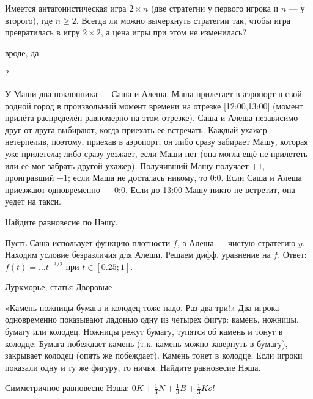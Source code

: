 \begin{problem}

Имеется антагонистическая игра $2\times n$ (две стратегии у первого игрока и $n$ — у второго), где $n\ge 2$. Всегда ли можно вычеркнуть стратегии так, чтобы игра превратилась в игру $2\times 2$, а цена игры при этом не изменилась?

\begin{sol}
 вроде, да
\end{sol}
\end{problem}

\begin{problem}
\begin{source}
\cite{ferguson:tn}?\end{source}
У Маши два поклонника — Саша и Алеша. Маша прилетает в аэропорт в свой родной город {\red в произвольный момент времени на отрезке [12:00,13:00] (момент прилёта распределён равномерно на этом отрезке)}. Саша и Алеша независимо друг от друга выбирают, когда приехать ее встречать. Каждый ухажер нетерпелив, поэтому, приехав в аэропорт, он либо сразу забирает Машу, которая уже прилетела; либо сразу уезжает, если Маши нет (она могла ещё не прилететь или ее мог забрать другой ухажер). Получивший Машу получает $+1$, проигравший $-1$; если Маша не досталась никому, то 0:0. Если Саша и Алеша приезжают одновременно — 0:0. Если до 13:00 Машу никто не встретит, она уедет на такси.

Найдите равновесие по Нэшу.



\begin{sol}
Пусть Саша использует функцию плотности $f$, а Алеша — чистую стратегию $y$. Находим условие безразличия для Алеши. Решаем дифф. уравнение на $f$. Ответ: $f(t)=\ldots t^{-3/2}$ при $t\in[0.25;1]$.
\end{sol}
\end{problem}



\begin{problem}[КНБ-2.]
\begin{source}
Луркморье, статья Дворовые
\end{source}
«Камень-ножницы-бумага и колодец тоже надо. Раз-два-три!»
Два игрока одновременно показывают ладонью одну из четырех фигур: камень, ножницы, бумагу или колодец. Ножницы режут бумагу, тупятся об камень и тонут в колодце. Бумага побеждает камень (т.к. камень можно завернуть в бумагу), закрывает колодец (опять же побеждает). Камень тонет в колодце. Если игроки показали одну и ту же фигуру, то ничья. Найдите равновесие Нэша.

\begin{sol}
Симметричное равновесие Нэша: $0K+\frac{1}{3}N+\frac{1}{3}B+\frac{1}{3}Kol$
\end{sol}
\end{problem}

